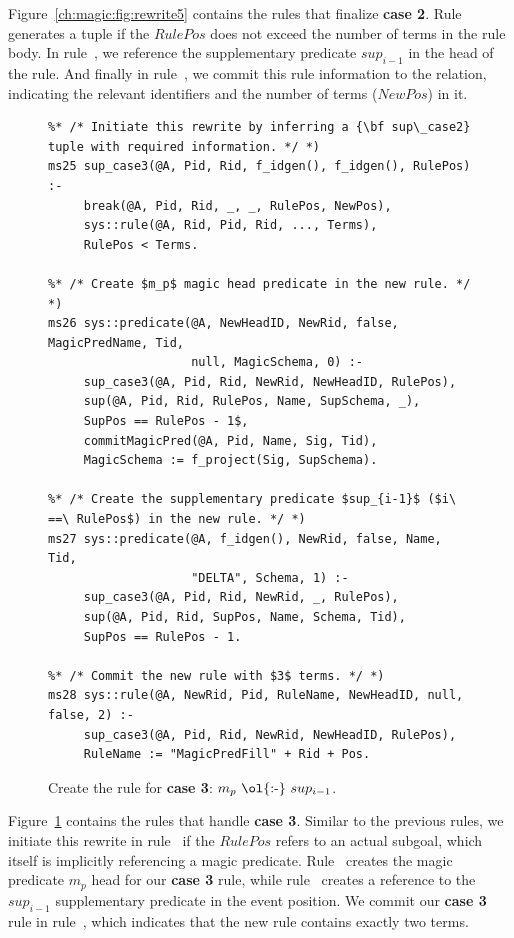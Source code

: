 Figure~\ref{ch:magic:fig:rewrite5} contains the rules that finalize {\bf case
2}.  Rule~ generates a  tuple if the $RulePos$ does not
exceed the number of terms in the rule body.  In rule~, we reference
the supplementary predicate $sup_{i-1}$ in the head of the rule.  And finally
in rule~, we commit this rule information to the  relation,
indicating the relevant identifiers and the number of terms ($NewPos$) in it.

\begin{figure}
\ssp
\centering
\begin{lstlisting}
%* /* Initiate this rewrite by inferring a {\bf sup\_case2} tuple with required information. */ *)
ms25 sup_case3(@A, Pid, Rid, f_idgen(), f_idgen(), RulePos) :-
     break(@A, Pid, Rid, _, _, RulePos, NewPos),
     sys::rule(@A, Rid, Pid, Rid, ..., Terms),
     RulePos < Terms.
	
%* /* Create $m_p$ magic head predicate in the new rule. */ *)
ms26 sys::predicate(@A, NewHeadID, NewRid, false, MagicPredName, Tid, 
                    null, MagicSchema, 0) :-
     sup_case3(@A, Pid, Rid, NewRid, NewHeadID, RulePos),
     sup(@A, Pid, Rid, RulePos, Name, SupSchema, _),
     SupPos == RulePos - 1$,
     commitMagicPred(@A, Pid, Name, Sig, Tid),
     MagicSchema := f_project(Sig, SupSchema).
	
%* /* Create the supplementary predicate $sup_{i-1}$ ($i\ ==\ RulePos$) in the new rule. */ *)
ms27 sys::predicate(@A, f_idgen(), NewRid, false, Name, Tid, 
                    "DELTA", Schema, 1) :-
     sup_case3(@A, Pid, Rid, NewRid, _, RulePos), 
     sup(@A, Pid, Rid, SupPos, Name, Schema, Tid),
     SupPos == RulePos - 1.

%* /* Commit the new rule with $3$ terms. */ *)
ms28 sys::rule(@A, NewRid, Pid, RuleName, NewHeadID, null, false, 2) :-
     sup_case3(@A, Pid, Rid, NewRid, NewHeadID, RulePos),
     RuleName := "MagicPredFill" + Rid + Pos.
\end{lstlisting}
\caption{\label{ch:magic:fig:rewrite6} 
Create the rule for {\bf case 3}: $m_p\ \text{\ol{:-}}\ sup_{i-1}$. } 
\end{figure}

Figure~\ref{ch:magic:fig:rewrite6} contains the rules that handle {\bf case 3}.
Similar to the previous rules, we initiate this rewrite in rule~ if
the $RulePos$ refers to an actual subgoal, which itself is implicitly
referencing a magic predicate.  Rule~ creates the magic predicate
$m_p$ head for our {\bf case 3} rule, while rule~ creates a reference
to the $sup_{i-1}$ supplementary predicate in the event position.
We commit our {\bf case 3} rule in rule~, which indicates that the
new rule contains exactly two terms.

